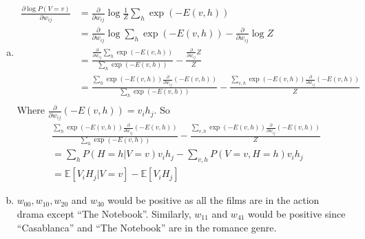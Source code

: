 \documentclass{article}
\begin{document}
\begin{enumerate}[(a)]
    \item \begin{align*}
        \frac{\partial \log P(V = v)}{\partial w_{ij}} &= \frac{\partial}{\partial w_{ij}} \log \frac{1}{Z}\sum_{h}\exp(-E(v, h)) \\[0.5ex] 
        &= \frac{\partial}{\partial w_{ij}} \log \sum_{h} \exp(-E(v, h)) - \frac{\partial}{\partial w_{ij}} \log Z \\[0.5ex]
        &= \frac{\frac{\partial}{\partial w_{ij}}\sum_h \exp(-E(v, h))}{\sum_h \exp(-E(v,h))} - \frac{\frac{\partial}{\partial w_{ij}} Z}{Z} \\[0.5ex]
        &= \frac{\sum_h \exp(-E(v, h))\frac{\partial}{\partial w_{ij}}(-E(v, h))}{\sum_h \exp(-E(v, h))} - \frac{\sum_{v, h}\exp(-E(v,h))\frac{\partial}{\partial w_{ij}}(-E(v,h))}{Z} \\[0.5ex]
    \end{align*}
    Where $\frac{\partial}{\partial w_{ij}}(-E(v, h)) = v_ih_j$. So 
    \begin{align*}
       & \frac{\sum_h  \exp(-E(v, h))\frac{\partial}{\partial w_{ij}}(-E(v, h))}{\sum_h \exp(-E(v, h))} - \frac{\sum_{v, h}\exp(-E(v,h))\frac{\partial}{\partial w_{ij}}(-E(v,h))}{Z} \\[0.5ex]
       &=  \sum_h P(H = h|V = v)v_ih_j - \sum_{v,h}P(V = v, H = h)v_ih_j \\[0.5ex]
       &= \mathbb{E}[V_iH_j|V = v] - \mathbb{E}[V_iH_j]
    \end{align*}
    \item $w_{00}, w_{10}, w_{20}$ and $w_{30}$ would be positive as all the films are in the action drama except ``The Notebook''. Similarly, $w_{11}$ and $w_{41}$ would be positive since ``Casablanca'' and ``The Notebook'' are in the romance genre.
\end{enumerate}
\end{document}
